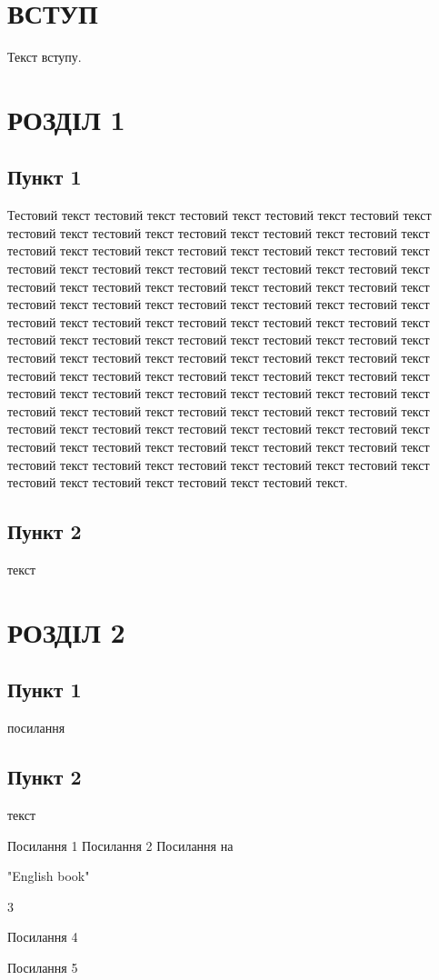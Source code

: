 \documentclass[14pt]{extarticle}
\newcommand{\issectionnumbered}{1}
\newcommand{\unnumberedsection}[1]{
\renewcommand{\issectionnumbered}{0}
\section*{#1}
\addcontentsline{toc}{section}{#1}
\renewcommand{\issectionnumbered}{1}
}
\begin{document}
\tableofcontents
\newpage

\vspace{1in}

\unnumberedsection{ВСТУП}

Текст вступу.

\section{РОЗДІЛ 1}
\subsection{Пункт 1}
Тестовий текст тестовий текст тестовий текст тестовий текст тестовий текст тестовий текст тестовий текст тестовий текст тестовий текст тестовий текст тестовий текст тестовий текст тестовий текст тестовий текст тестовий текст тестовий текст тестовий текст тестовий текст тестовий текст тестовий текст тестовий текст тестовий текст тестовий текст тестовий текст тестовий текст тестовий текст тестовий текст тестовий текст тестовий текст тестовий текст тестовий текст тестовий текст тестовий текст тестовий текст тестовий текст тестовий текст тестовий текст тестовий текст тестовий текст тестовий текст тестовий текст тестовий текст тестовий текст тестовий текст тестовий текст тестовий текст тестовий текст тестовий текст тестовий текст тестовий текст тестовий текст тестовий текст тестовий текст тестовий текст тестовий текст тестовий текст тестовий текст тестовий текст тестовий текст тестовий текст тестовий текст тестовий текст тестовий текст тестовий текст тестовий текст тестовий текст тестовий текст тестовий текст тестовий текст тестовий текст тестовий текст тестовий текст тестовий текст тестовий текст тестовий текст тестовий текст тестовий текст тестовий текст тестовий текст.
\subsection{Пункт 2}
текст
\section{РОЗДІЛ 2}
\subsection{Пункт 1}
посилання \cite{bib1,bib3,bib4,bib5}
\subsection{Пункт 2}
текст

\begin{thebibliography}{9}
Посилання 1
Посилання 2
Посилання на
\begin{otherlanguage}{english}%
"English book"%
\end{otherlanguage}
3

Посилання 4

Посилання 5

\end{thebibliography}
\end{document}
